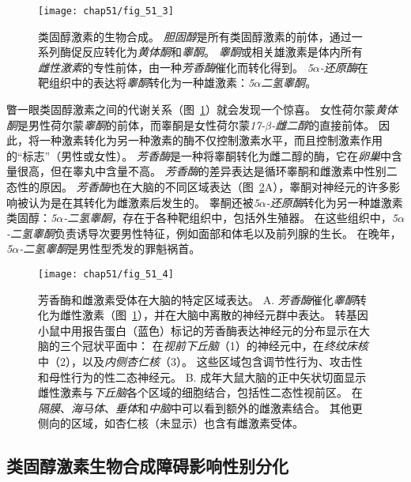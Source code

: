 \begin{figure}[htbp]
	\centering
	\texttt{[image: chap51/fig\_51\_3]}
	\caption{类固醇激素的生物合成。
		\textit{胆固醇}是所有类固醇激素的前体，通过一系列酶促反应转化为\textit{黄体酮}和\textit{睾酮}。
		\textit{睾酮}或相关雄激素是体内所有\textit{雌性激素}的专性前体，由一种\textit{芳香酶}催化而转化得到。
		\textit{5$\alpha$-还原酶}在靶组织中的表达将\textit{睾酮}转化为一种雄激素：\textit{5$ \alpha $二氢睾酮}。}
	\label{fig:51_3}
\end{figure}


瞥一眼类固醇激素之间的代谢关系（图~\ref{fig:51_3}）就会发现一个惊喜。
女性荷尔蒙\textit{黄体酮}是男性荷尔蒙\textit{睾酮}的前体，而睾酮是女性荷尔蒙\textit{17-$ \beta $-雌二醇}的直接前体。
因此，将一种激素转化为另一种激素的酶不仅控制激素水平，而且控制激素作用的“标志”（男性或女性）。
\textit{芳香酶}是一种将睾酮转化为雌二醇的酶，它在\textit{卵巢}中含量很高，但在睾丸中含量不高。
\textit{芳香酶}的差异表达是循环睾酮和雌激素中性别二态性的原因。
\textit{芳香酶}也在大脑的不同区域表达（图~\ref{fig:51_4}A），睾酮对神经元的许多影响被认为是在其转化为雌激素后发生的。
睾酮还被\textit{5$\alpha$-还原酶}转化为另一种雄激素类固醇：\textit{5$\alpha$-二氢睾酮}，存在于各种靶组织中，包括外生殖器。
在这些组织中，\textit{5$\alpha$-二氢睾酮}负责诱导次要男性特征，例如面部和体毛以及前列腺的生长。
在晚年，\textit{5$\alpha$-二氢睾酮}是男性型秃发的罪魁祸首。


\begin{figure}[htbp]
	\centering
	\texttt{[image: chap51/fig\_51\_4]}
	\caption{芳香酶和雌激素受体在大脑的特定区域表达。 
		A. \textit{芳香酶}催化\textit{睾酮}转化为雌性激素（图~\ref{fig:51_3}），并在大脑中离散的神经元群中表达。
		转基因小鼠中用报告蛋白（蓝色）标记的芳香酶表达神经元的分布显示在大脑的三个冠状平面中：
		在\textit{视前下丘脑}（1）的神经元中，在\textit{终纹床核}中（2），以及\textit{内侧杏仁核}（3）。
		这些区域包含调节性行为、攻击性和母性行为的性二态神经元\cite{wu2009estrogen}。
		B. 成年大鼠大脑的正中矢状切面显示雌性激素与\textit{下丘脑}各个区域的细胞结合，包括性二态性视前区。
		在\textit{隔膜}、\textit{海马体}、\textit{垂体}和\textit{中脑}中可以看到额外的雌激素结合。
		其他更侧向的区域，如杏仁核（未显示）也含有雌激素受体。}
	\label{fig:51_4}
\end{figure}



\subsection{类固醇激素生物合成障碍影响性别分化}

